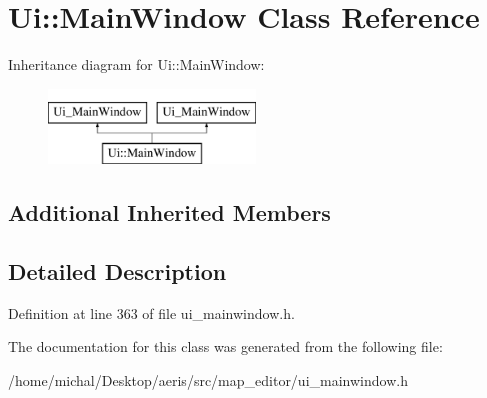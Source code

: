 \hypertarget{classUi_1_1MainWindow}{\section{Ui\-:\-:Main\-Window Class Reference}
\label{classUi_1_1MainWindow}
}
Inheritance diagram for Ui\-:\-:Main\-Window\-:\begin{figure}[H]
\begin{center}
\leavevmode
\includegraphics[height=2.000000cm]{classUi_1_1MainWindow}
\end{center}
\end{figure}
\subsection*{Additional Inherited Members}


\subsection{Detailed Description}


Definition at line 363 of file ui\-\_\-mainwindow.\-h.



The documentation for this class was generated from the following file\-:\begin{DoxyCompactItemize}
\item 
/home/michal/\-Desktop/aeris/src/map\-\_\-editor/ui\-\_\-mainwindow.\-h\end{DoxyCompactItemize}
